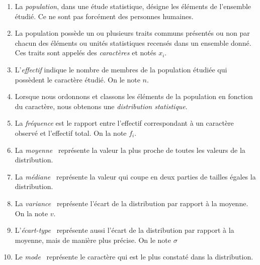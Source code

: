 \begin{definition}
\begin{enumerate}
\item La \emph{population}, dans une étude statistique, désigne les éléments de l’ensemble étudié. Ce ne sont pas forcément des personnes humaines.
\item La population possède un ou plusieurs traits communs présentés ou non par chacun des éléments ou unités statistiques recensés dans un ensemble donné. Ces traits sont appelés des \emph{caractères} et notés $x_i$.
\item L’\emph{effectif} indique le nombre de membres de la population étudiée qui possèdent le caractère étudié. On le note $n$.
\item Lorsque nous ordonnons et classons les éléments de la population en fonction du caractère, nous obtenons une \emph{distribution statistique}.
\item La \emph{fréquence} est le rapport entre l’effectif correspondant à un caractère observé et l’effectif total. On la note $f_i$.
\item La \emph{moyenne}~ représente la valeur la plus proche de toutes les valeurs de la distribution.
\item La \emph{médiane}~ représente la valeur qui coupe en deux parties de tailles égales la distribution.
\item La \emph{variance}~ représente l'écart de la distribution par rapport à la moyenne. On la note $v$.
\item L'\emph{écart-type}~ représente aussi l'écart de la distribution par rapport à la moyenne, mais de manière plus précise. On le note $\sigma$
\item Le \emph{mode}~ représente le caractère qui est le plus constaté dans la distribution.
\end{enumerate}
\end{definition}

